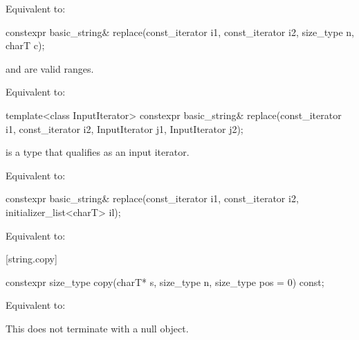 \begin{itemdescr}
\pnum
\effects
Equivalent to: 
\end{itemdescr}

%
\begin{itemdecl}
constexpr basic_string& replace(const_iterator i1, const_iterator i2, size_type n, charT c);
\end{itemdecl}

\begin{itemdescr}
\pnum
\expects
{} and  are valid ranges.

\pnum
\effects
Equivalent to: 
\end{itemdescr}

%
\begin{itemdecl}
template<class InputIterator>
  constexpr basic_string& replace(const_iterator i1, const_iterator i2,
                                  InputIterator j1, InputIterator j2);
\end{itemdecl}

\begin{itemdescr}
\pnum
\constraints
{} is a type that qualifies as an input
iterator.

\pnum
\effects
Equivalent to: 
\end{itemdescr}

%
\begin{itemdecl}
constexpr basic_string& replace(const_iterator i1, const_iterator i2, initializer_list<charT> il);
\end{itemdecl}

\begin{itemdescr}
\pnum
\effects
Equivalent to: 
\end{itemdescr}

[string.copy]{}

%
\begin{itemdecl}
constexpr size_type copy(charT* s, size_type n, size_type pos = 0) const;
\end{itemdecl}

\begin{itemdescr}
\pnum
\effects
Equivalent to:
\begin{note}
This does not terminate  with a null object.
\end{note}
\end{itemdescr}

